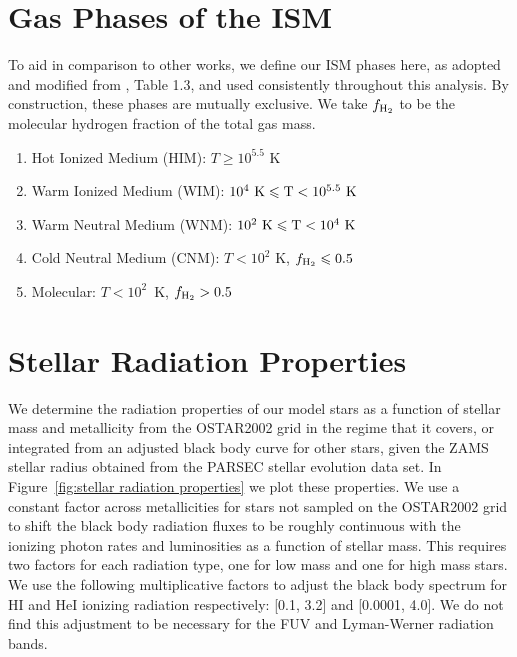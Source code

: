 \documentclass[fleqn,usenatbib,useAMS]{mnras}
\begin{document}
\section{Gas Phases of the ISM}
\label{appendix:phases}

To aid in comparison to other works, we define our ISM phases here, as adopted and modified from \citet{Draine2011}, Table 1.3, and used consistently throughout this analysis. By construction, these phases are mutually exclusive. We take $f_{\rm H_2}$ to be the molecular hydrogen fraction of the total gas mass.

\begin{enumerate}
\item Hot Ionized Medium (HIM): $T \geq 10^{5.5}$ K
\item Warm Ionized Medium (WIM): $10^{4}~\rm{K} \leq T < 10^{5.5}~\rm{K} $
\item Warm Neutral Medium (WNM): $10^{2}~\rm{K} \leq T < 10^{4}~ \rm{K}$
\item Cold Neutral Medium (CNM): $T < 10^2$ K, $f_{\rm H_2} \leq 0.5$
\item Molecular: $T < 10^2$~K, $f_{\rm H_2} > 0.5$
\end{enumerate}

\section{Stellar Radiation Properties}
\label{appendix:radiation}
We determine the radiation properties of our model stars as a function of stellar mass and metallicity from the OSTAR2002 grid \citep{Lanz2003} in the regime that it covers, or integrated from an adjusted black body curve for other stars, given the ZAMS stellar radius obtained from the PARSEC \citep{Bressan2012,Tang2014} stellar evolution data set. In Figure~\ref{fig:stellar radiation properties} we plot these properties. We use a constant factor across metallicities for stars not sampled on the OSTAR2002 grid to shift the black body radiation fluxes to be roughly continuous with the ionizing photon rates and luminosities as a function of stellar mass. This requires two factors for each radiation type, one for low mass and one for high mass stars. We use the following multiplicative factors to adjust the black body spectrum for HI and HeI ionizing radiation respectively: [0.1, 3.2] and [0.0001, 4.0]. We do not find this adjustment to be necessary for the FUV and Lyman-Werner radiation bands.
\end{document}
